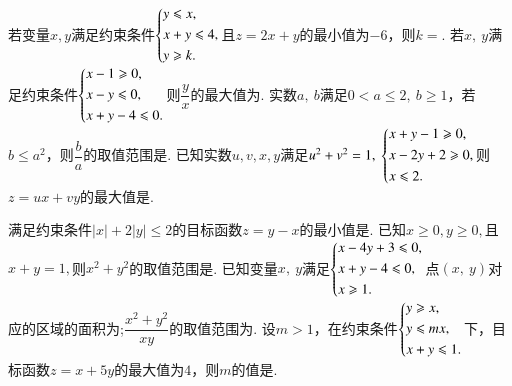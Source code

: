 \documentclass{BHCexam}
\begin{document}
\begin{questions}
\qs 若变量$x,y$满足约束条件$\begin{dcases}
y\le x,\\
x+y\le 4,\\
y\ge k.
\end{dcases}$且$z=2x+y$的最小值为$ -6 $，则$ k= $\tk.
\qs 若$  x,~y $满足约束条件$\begin{dcases}
x-1\ge 0,\\
x-y\le 0,\\
x+y-4\le 0.
\end{dcases}$则$ \dfrac{y}{x} $的最大值为\tk.
\qs 实数$ a,~b $满足$ 0<a\le 2,~b\ge 1 $，若$ b\le a^2 $，则$ \dfrac{b}{a} $的取值范围是\tk.
\qs 已知实数$ u,v,x,y $满足$ u^2+v^2=1,~\begin{dcases}
x+y-1\ge 0,\\
x-2y+2\ge 0,\\
x\le 2.
\end{dcases} $则$ z=ux+vy $的最大值是\tk.

\qs 满足约束条件$ \left|x\right|+2\left|y\right|\le 2 $的目标函数$ z=y-x $的最小值是\tk.
\qs 已知$ x\ge0,y\ge0 ,$且$ x+y=1 ,$则$ x^2+y^2 $的取值范围是\tk.
\qs 已知变量$ x,~y $满足$\begin{dcases}
x-4y+3\le 0,\\
x+y-4\le 0,\\
x\ge 1.
\end{dcases}$点$ (x,~y) $对应的区域的面积为\tk;$ \dfrac{x^2+y^2}{xy} $的取值范围为\tk.
\qs 设$ m>1 $，在约束条件$\begin{dcases}
y\ge x,\\
y\le mx,\\
x+y\le1. 
\end{dcases}$下，目标函数$ z=x+5y $的最大值为$ 4 $，则$ m $的值是\tk.

\end{questions}
\end{document}
